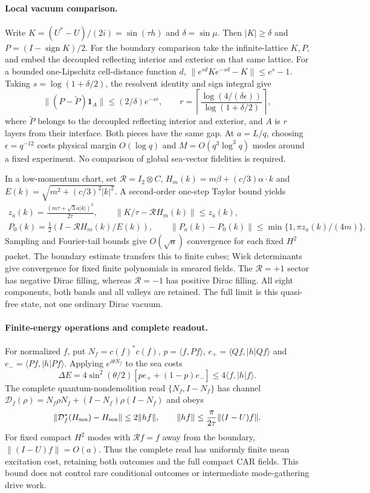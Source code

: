 \paragraph{Local vacuum comparison.}
Write $K=(U^*-U)/(2i)=\sin(\tau h)$ and $\delta=\sin\mu$.
Then $|K|\ge\delta$ and $P=(I-\operatorname{sign}K)/2$.
For the boundary comparison take the infinite-lattice $K,P$, and embed
the decoupled reflecting interior and exterior on that same lattice.
For a bounded one-Lipschitz cell-distance function $d$,
$\|e^{sd}Ke^{-sd}-K\|\le e^s-1$. Taking $s=\log(1+\delta/2)$,
the resolvent identity and sign integral give
\[
 \|(P-\widetilde P)\mathbf1_A\|\le(2/\delta)e^{-sr},\qquad
 r=\left\lceil\frac{\log(4/(\delta\epsilon))}{\log(1+\delta/2)}\right\rceil,
\]
where $\widetilde P$ belongs to the decoupled reflecting interior and
exterior, and $A$ is $r$ layers from their interface. Both pieces have the
same gap. At $a=L/q$, choosing $\epsilon=q^{-12}$ costs physical margin
$O(\log q)$ and $M=O(q^3\log^3q)$ modes around a fixed experiment.
No comparison of global sea-vector fidelities is required.

In a low-momentum chart, set $\mathcal R=I_2\otimes C$,
$H_m(k)=m\beta+(c/3)\alpha\cdot k$ and
$E(k)=\sqrt{m^2+(c/3)^2|k|^2}$. A second-order one-step Taylor bound yields
\[
 \begin{gathered}
 z_a(k)=\frac{(m\tau+\sqrt3a|k|)^2}{2\tau},\qquad
 \|K/\tau-\mathcal R H_m(k)\|\le z_a(k),\\
 P_0(k)=\tfrac12(I-\mathcal R H_m(k)/E(k)),\qquad
 \|P_a(k)-P_0(k)\|\le\min\{1,\pi z_a(k)/(4m)\}.
 \end{gathered}
\]
Sampling and Fourier-tail bounds give $O(\sqrt a)$ convergence for each
fixed $H^2$ packet. The boundary estimate transfers this to finite cubes;
Wick determinants give convergence for fixed finite polynomials in smeared
fields. The $\mathcal R=+1$ sector has negative Dirac filling, whereas
$\mathcal R=-1$ has positive Dirac filling. All eight components, both bands
and all valleys are retained. The full limit is this quasi-free state,
not one ordinary Dirac vacuum.

\paragraph{Finite-energy operations and complete readout.}
For normalized $f$, put $N_f=c(f)^*c(f)$, $p=\langle f,Pf\rangle$,
$e_+=\langle Qf,|h|Qf\rangle$ and $e_-=\langle Pf,|h|Pf\rangle$.
Applying $e^{i\theta N_f}$ to the sea costs
\[
 \Delta E=4\sin^2(\theta/2)[p e_+ +(1-p)e_-]\le4\langle f,|h|f\rangle.
\]
The complete quantum-nondemolition read $\{N_f,I-N_f\}$ has channel
$\mathcal D_f(\rho)=N_f\rho N_f+(I-N_f)\rho(I-N_f)$ and obeys
\[
 \|\mathcal D_f^*(H_{\rm sea})-H_{\rm sea}\|\le2\|hf\|,
 \qquad \|hf\|\le\frac{\pi}{2\tau}\|(I-U)f\|.
\]
For fixed compact $H^2$ modes with $\mathcal Rf=f$ away from the boundary,
$\|(I-U)f\|=O(a)$. Thus the complete read has uniformly finite mean
excitation cost, retaining both outcomes and the full compact CAR fields.
This bound does not control rare conditional outcomes or intermediate
mode-gathering drive work.

